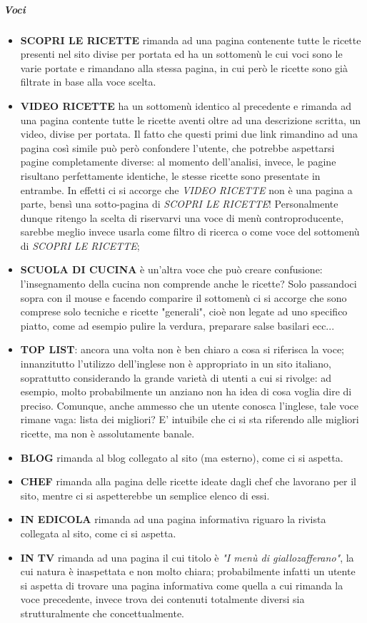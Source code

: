 \subparagraph{Voci}
\begin{itemize}
	\item \textbf{SCOPRI LE RICETTE} rimanda ad una pagina contenente tutte le ricette presenti nel sito divise per portata ed ha un sottomenù le cui voci sono le varie portate e rimandano alla stessa pagina, in cui però le ricette sono già filtrate in base alla voce scelta.
	\item \textbf{VIDEO RICETTE} ha un sottomenù identico al precedente e rimanda ad una pagina contente tutte le ricette aventi oltre ad una descrizione scritta, un video, divise per portata. Il fatto che questi primi due link rimandino ad una pagina così simile può però confondere l'utente, che potrebbe aspettarsi pagine completamente diverse: al momento dell'analisi, invece, le pagine risultano perfettamente identiche, le stesse ricette sono presentate in entrambe. In effetti ci si accorge che \textit{VIDEO RICETTE} non è una pagina a parte, bensì una sotto-pagina di \textit{SCOPRI LE RICETTE}! Personalmente dunque ritengo la scelta di riservarvi una voce di menù controproducente, sarebbe meglio invece usarla come filtro di ricerca o come voce del sottomenù di \textit{SCOPRI LE RICETTE};
	\item \textbf{SCUOLA DI CUCINA} è un'altra voce che può creare confusione: l'insegnamento della cucina non comprende anche le ricette? Solo passandoci sopra  con il mouse e facendo comparire il sottomenù ci si accorge che sono comprese solo tecniche e ricette "generali", cioè non legate ad uno specifico piatto, come ad esempio pulire la verdura,  preparare salse basilari ecc...
	\item \textbf{TOP LIST}: ancora una volta non è ben chiaro a cosa si riferisca la voce; innanzitutto l'utilizzo dell'inglese non è appropriato in un sito italiano, soprattutto considerando la grande varietà di utenti a cui si rivolge: ad esempio, molto probabilmente un anziano non ha idea di cosa voglia dire di preciso. 
	Comunque, anche ammesso che un utente conosca l'inglese, tale voce rimane vaga: lista dei migliori? E' intuibile che ci si sta riferendo alle migliori ricette, ma non è assolutamente banale.
	\item \textbf{BLOG} rimanda al blog collegato al sito (ma esterno), come ci si aspetta.
	\item \textbf{CHEF} rimanda alla pagina delle ricette ideate dagli chef che lavorano per il sito, mentre ci si aspetterebbe un semplice elenco di essi.
	\item \textbf{IN EDICOLA} rimanda ad una pagina informativa riguaro la rivista collegata al sito, come ci si aspetta.
	\item \textbf{IN TV} rimanda ad una pagina il cui titolo è \textit{"I menù di giallozafferano"}, la cui natura è inaspettata e non molto chiara; probabilmente infatti un utente si aspetta di trovare una pagina informativa come quella a cui rimanda la voce precedente, invece trova dei contenuti totalmente diversi sia strutturalmente che concettualmente.
\end{itemize}


